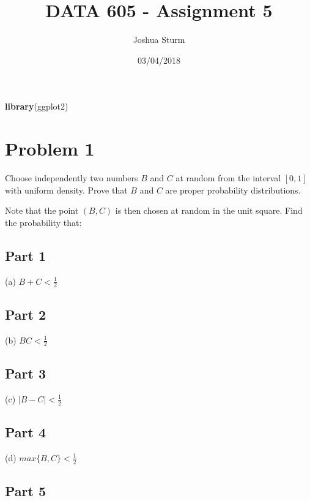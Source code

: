 \documentclass[]{article}
\title{DATA 605 - Assignment 5}
\author{Joshua Sturm}
\date{03/04/2018}
\newenvironment{Shaded}{\begin{snugshade}}{\end{snugshade}}
\newcommand{\KeywordTok}[1]{\textcolor[rgb]{0.13,0.29,0.53}{\textbf{#1}}}
\newcommand{\NormalTok}[1]{#1}
\begin{document}
\maketitle

\begin{Shaded}
\begin{Highlighting}[]
\KeywordTok{library}\NormalTok{(ggplot2)}
\end{Highlighting}
\end{Shaded}

\section{Problem 1}\label{problem-1}

Choose independently two numbers \(B\) and \(C\) at random from the
interval \([0, 1]\) with uniform density. Prove that \(B\) and \(C\) are
proper probability distributions.

Note that the point \((B,C)\) is then chosen at random in the unit
square. Find the probability that:

\subsection{Part 1}\label{part-1}

\indent (a) \(B + C < \frac{1}{2}\)

\subsection{Part 2}\label{part-2}

\indent (b) \(BC < \frac{1}{2}\)

\subsection{Part 3}\label{part-3}

\indent (c) \(|B - C| < \frac{1}{2}\)

\subsection{Part 4}\label{part-4}

\indent (d) \(max\{B,C\} < \frac{1}{2}\)

\subsection{Part 5}\label{part-5}
\end{document}
